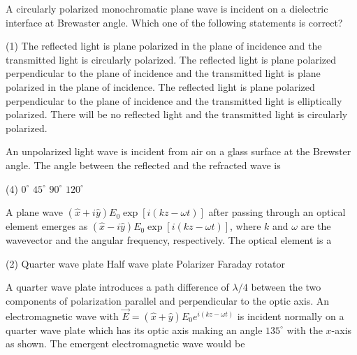 \begin{enumerate}
\begin{minipage}{\textwidth}
	\item A circularly polarized monochromatic plane wave is incident on a dielectric interface at Brewaster angle. Which one of the following statements is correct?
\end{minipage}
\begin{tasks}(1)
	\task[\textbf{A.}] The reflected light is plane polarized in the plane of incidence and the transmitted light is circularly polarized.
	\task[\textbf{B.}]The reflected light is plane polarized perpendicular to the plane of incidence and the transmitted light is plane polarized in the plane of incidence.
	\task[\textbf{C.}]The reflected light is plane polarized perpendicular to the plane of incidence and the transmitted light is elliptically polarized.
	\task[\textbf{D.}]There will be no reflected light and the transmitted light is circularly polarized.
\end{tasks}
\begin{minipage}{\textwidth}
	\item An unpolarized light wave is incident from air on a glass surface at the Brewster angle. The angle between the reflected and the refracted wave is
\end{minipage}
\begin{tasks}(4)
	\task[\textbf{A.}] $0^{\circ}$
	\task[\textbf{B.}]$45^{\circ}$
	\task[\textbf{C.}]$90^{\circ}$
	\task[\textbf{D.}]$120^{\circ}$
\end{tasks}
\begin{minipage}{\textwidth}
	\item A plane wave $(\hat{x}+i \hat{y}) E_{0} \exp [i(k z-\omega t)]$ after passing through an optical element emerges as $(\hat{x}-i \hat{y}) E_{0} \exp [i(k z-\omega t)]$, where $k$ and $\omega$ are the wavevector and the angular frequency, respectively. The optical element is a
\end{minipage}
\begin{tasks}(2)
	\task[\textbf{A.}] Quarter wave plate
	\task[\textbf{B.}] Half wave plate
	\task[\textbf{C.}] Polarizer
	\task[\textbf{D.}]Faraday rotator
\end{tasks}
\begin{minipage}{\textwidth}
	\item A quarter wave plate introduces a path difference of $\lambda / 4$ between the two components of polarization parallel and perpendicular to the optic axis. An electromagnetic wave with $\vec{E}=(\hat{x}+\hat{y}) E_{0} e^{i(k z-\omega t)}$ is incident normally on a quarter wave plate which has its optic axis making an angle $135^{\circ}$ with the $x$-axis as shown. The emergent electromagnetic wave would be

\end{minipage}
\end{enumerate}
